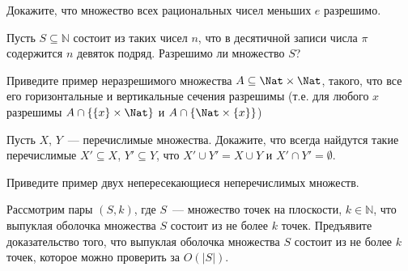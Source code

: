 \setcounter{curtask}{6}


\begin{task}
    Докажите, что множество всех рациональных чисел меньших $e$ разрешимо.
\end{task}

\begin{task}
    Пусть $S \subseteq \mathbb{N}$ состоит из таких чисел $n$, что в десятичной
    записи числа $\pi$ содержится $n$ девяток подряд. Разрешимо ли множество $S$?
\end{task}

\begin{task}
    Приведите пример неразрешимого множества $A \subseteq \Nat \times \Nat$,
    такого, что все его горизонтальные и вертикальные сечения
    разрешимы (т.е. для любого $x$ разрешимы $A \cap \{\{x\} \times \Nat\}$
    и $A \cap \{\Nat \times \{x\}\}$)
\end{task}

\begin{task}
    Пусть $X$, $Y$~--- перечислимые множества. Докажите, что всегда
    найдутся такие перечислимые $X' \subseteq X$, $Y' \subseteq Y$,
    что $X' \cup Y' = X \cup Y$ и $X' \cap Y' = \emptyset$.
\end{task}

\begin{task}
    Приведите пример двух непересекающиеся неперечислимых множеств.
\end{task}

\begin{task}
    Рассмотрим пары $(S, k)$, где $S$~--- множество точек на плоскости, $k
    \in \mathbb{N}$, что выпуклая оболочка множества $S$ состоит из не более $k$
    точек. Предъявите доказательство того, что выпуклая оболочка множества $S$
    состоит из не более $k$ точек, которое можно проверить за $O(|S|)$.
\end{task}